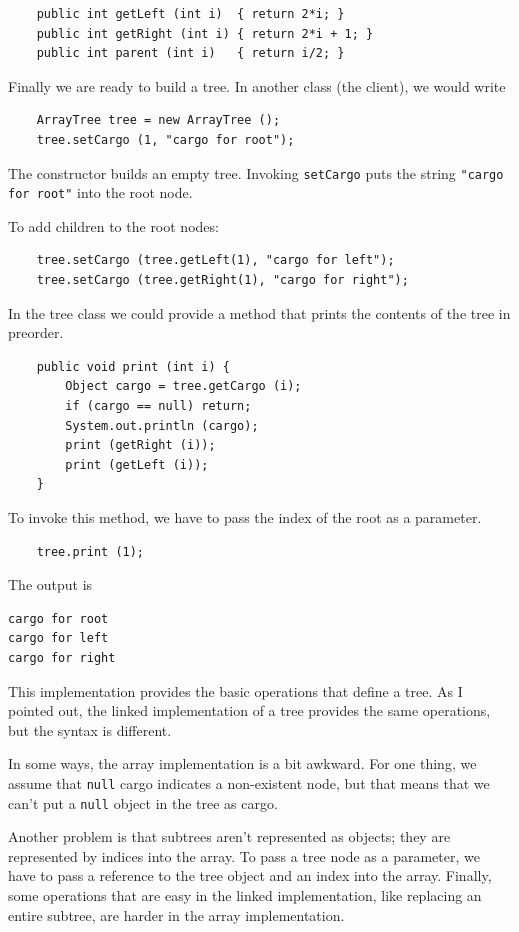 \documentclass[12pt]{book}
\theoremstyle{exercise}
\begin{document}
\begin{verbatim}
    public int getLeft (int i)  { return 2*i; }
    public int getRight (int i) { return 2*i + 1; }
    public int parent (int i)   { return i/2; }
\end{verbatim}
%
Finally we are ready to build a tree.  In another class (the client),
we would write

\begin{verbatim}
    ArrayTree tree = new ArrayTree ();
    tree.setCargo (1, "cargo for root");
\end{verbatim}
%
The constructor builds an empty tree.
Invoking {\tt setCargo} puts the
string {\tt "cargo for root"} into the root node.

To add children to the root nodes:

\begin{verbatim}
    tree.setCargo (tree.getLeft(1), "cargo for left");
    tree.setCargo (tree.getRight(1), "cargo for right");
\end{verbatim}
%
In the tree class we could provide a method that prints
the contents of the tree in preorder.

\begin{verbatim}
    public void print (int i) {
        Object cargo = tree.getCargo (i);
        if (cargo == null) return;
        System.out.println (cargo);
        print (getRight (i));
        print (getLeft (i));
    }
\end{verbatim}
%
To invoke this method, we have to pass the index of
the root as a parameter.

\begin{verbatim}
    tree.print (1);
\end{verbatim}
%
The output is

\begin{verbatim}
cargo for root
cargo for left
cargo for right
\end{verbatim}
%
This implementation provides the basic operations that define a
tree.  As I pointed out, the linked implementation of a tree provides
the same operations, but the syntax is different.

In some ways, the array implementation is a bit awkward.  For
one thing, we assume that {\tt null} cargo indicates a non-existent
node, but that means that we can't put a {\tt null} object in the
tree as cargo.

Another problem is that subtrees aren't represented as objects;
they are represented by indices into the array.  To pass a tree
node as a parameter, we have to pass a reference to the tree
object and an index into the array.
Finally, some operations that are easy in the linked implementation,
like replacing an entire subtree, are harder in the array implementation.
\end{document}
